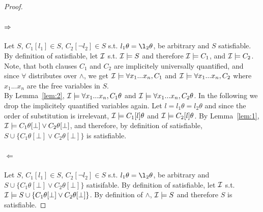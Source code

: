 \begin{proof}$ $
  \paragraph{$\Rightarrow$}
  Let $S$, $C_1[l_1] \in S$, $C_2[\neg l_2] \in S$ s.t. $l_1\theta = \l_2\theta$, be arbitrary and $S$ satisfiable.
  By definition of satisfiable, let $\mathcal{I}$ s.t. $\mathcal{I} \models S$ and therefore $\mathcal{I} \models C_1$, and $\mathcal{I} \models C_2$.
  Note, that both clauses $C_1$ and $C_2$ are implicitely universally quantified, and since $\forall$ distributes over $\land$, we get $\mathcal{I} \models \forall x_1...x_n, C_1$ and $\mathcal{I} \models \forall x_1...x_n, C_2$ where $x_1...x_n$ are the free variables in $S$.\\
  By Lemma~\ref{lem:2}, $\mathcal{I} \models \forall x_1...x_n, C_1\theta$ and $\mathcal{I} \models \forall x_1...x_n, C_2\theta$. In the following we drop the implicitely quantified variables again. Let $l = l_1\theta = l_2\theta$ and since the order of substitution is irrelevant, $\mathcal{I} \models C_1[l]\theta$ and $\mathcal{I} \models C_2[l]\theta$. By Lemma~\ref{lem:1}, $\mathcal{I} \models C_1\theta[\bot] \vee C_2\theta[\bot]$, and therefore, by definition of satisfiable, $S \cup \{C_1\theta[\bot] \lor C_2\theta[\bot]\}$ is satisfiable.
  \paragraph{$\Leftarrow$}
  Let $S$, $C_1[l_1] \in S$, $C_2[\neg l_2] \in S$ s.t. $l_1\theta = \l_2\theta$, be arbitrary and $S \cup \{C_1\theta[\bot] \lor C_2\theta[\bot]\}$ satisifable.
  By definition of satisfiable, let $\mathcal{I}$ s.t. $\mathcal{I} \models S \cup \{C_1\theta[\bot] \lor C_2\theta[\bot]\}$. By definition of $\land$, $\mathcal{I} \models S$ and therefore $S$ is satisfiable.
\end{proof}

